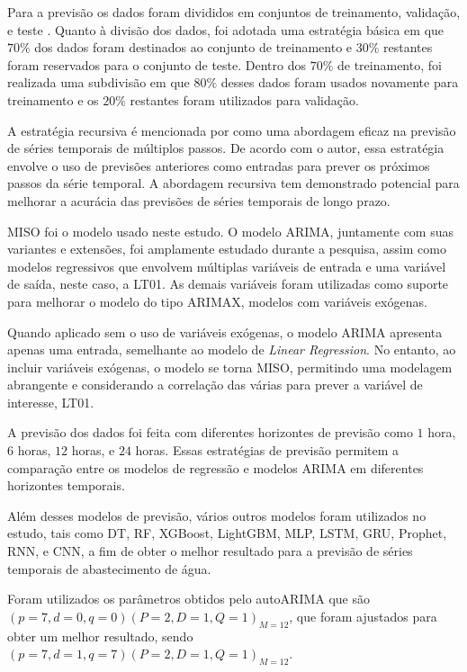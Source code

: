 Para a previsão os dados foram divididos em conjuntos de treinamento, validação, e teste \cite{raschka2015practical, geron2017hands_on}. Quanto à divisão dos dados, foi adotada uma estratégia básica em que $70\%$ dos dados foram destinados ao conjunto de treinamento e $30\%$ restantes foram reservados para o conjunto de teste. Dentro dos $70\%$ de treinamento, foi realizada uma subdivisão em que $80\%$ desses dados foram usados novamente para treinamento e os $20\%$ restantes foram utilizados para validação. 

A estratégia recursiva é mencionada por  como uma abordagem eficaz na previsão de séries temporais de múltiplos passos. De acordo com o autor, essa estratégia envolve o uso de previsões anteriores como entradas para prever os próximos passos da série temporal. A abordagem recursiva tem demonstrado potencial para melhorar a acurácia das previsões de séries temporais de longo prazo.

MISO foi o modelo usado neste estudo. O modelo ARIMA, juntamente com suas variantes e extensões, foi amplamente estudado durante a pesquisa, assim como modelos regressivos que envolvem múltiplas variáveis de entrada e uma variável de saída, neste caso, a LT01. As demais variáveis foram utilizadas como suporte para melhorar o modelo do tipo ARIMAX, modelos com variáveis exógenas. 

Quando aplicado sem o uso de variáveis exógenas, o modelo ARIMA apresenta apenas uma entrada, semelhante ao modelo de \textit{Linear Regression}. No entanto, ao incluir variáveis exógenas, o modelo se torna MISO, permitindo uma modelagem  abrangente e considerando a correlação das várias para prever a variável de interesse, LT01.

A previsão dos dados foi feita com diferentes horizontes de previsão como $1$ hora, $6$ horas, $12$ horas, e $24$ horas. Essas estratégias de previsão permitem a comparação entre os modelos de regressão e modelos ARIMA em diferentes horizontes temporais.

Além desses modelos de previsão, vários outros modelos foram utilizados no estudo, tais como DT, RF, XGBoost, LightGBM, MLP, LSTM, GRU, Prophet, RNN, e CNN, a fim de obter o melhor resultado para a previsão de séries temporais de abastecimento de água.

Foram utilizados os parâmetros obtidos pelo autoARIMA que são $(p = 7, d = 0, q = 0) (P = 2, D = 1, Q = 1)_{M = 12}$, que foram ajustados para obter um melhor resultado, sendo $(p = 7, d = 1, q = 7) (P = 2, D = 1, Q = 1)_{M = 12}$. 

